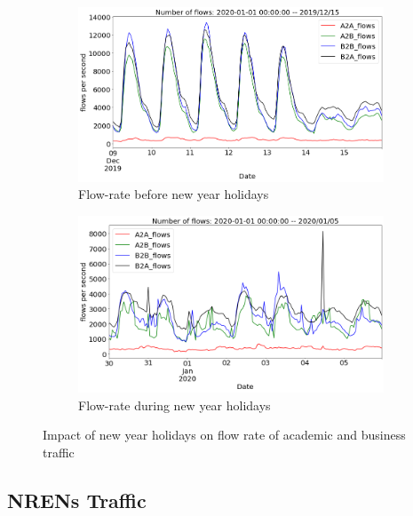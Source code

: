 \documentclass[10pt, journal, letterpaper]{IEEEtran}
\newcommand\linearFigSze{0.48}
\begin{document}
\begin{figure}
    \begin{subfigure}{\linearFigSze\textwidth}
          \centering
          \includegraphics[width=\columnwidth]{img/BCH2_acaBus_fps.png}
          \caption{Flow-rate before new year holidays}
          \label{fig:BCH2_acaBus_fps}
    \end{subfigure}
    \begin{subfigure}{\linearFigSze\textwidth}
          \centering
          \includegraphics[width=\columnwidth]{img/CH2_acaBus_fps.png}
          \caption{Flow-rate during new year holidays}
          \label{fig:CH2_acaBus_fps}
    \end{subfigure}
    \caption{Impact of new year holidays on flow rate of academic and business traffic}
    \label{fig:flowrate_acaBus_BCH_CH}
\end{figure}

\subsection{NRENs Traffic}
\end{document}
